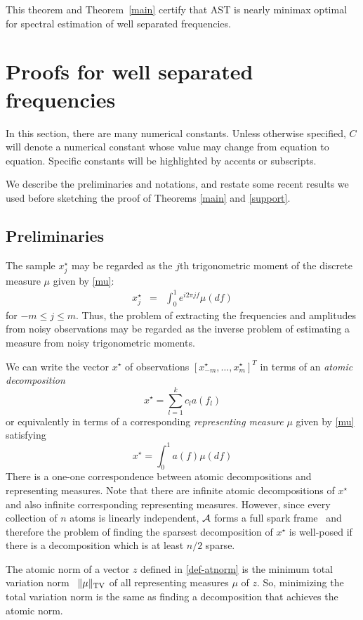 This theorem and Theorem~\ref{main} certify that AST is nearly minimax optimal for spectral estimation of well separated frequencies. 

\section{Proofs for well separated frequencies}
\label{sec:proofs}

In this section, there are many numerical constants. Unless otherwise specified,
$C$ will denote a numerical constant whose value may change from equation to
equation. Specific constants will be highlighted by accents or subscripts.

We describe the preliminaries and notations, and restate some recent results we
used before sketching the proof of Theorems \ref{main} and \ref{support}.

\subsection{Preliminaries}
The sample $x^\star_j$ may be regarded as the $j$th trigonometric moment of 
the discrete measure $\mu$ given by \eqref{mu}:
\begin{eqnarray*}
  x_j^\star & = & \int_0^1 e^{i 2 \pi j f} \mu ( d f)
\end{eqnarray*}
for $-m \leq j \leq m$.
Thus, the problem of extracting the frequencies and amplitudes from noisy 
observations may be regarded as the inverse problem of estimating a measure 
from noisy trigonometric moments.

We can write the vector $x^\star$ of observations $[x_{-m}^\star, \ldots, x_m^\star]^T$ in terms of an \emph{atomic decomposition}
\[
x^\star = \sum_{l=1}^k c_l a(f_l)
\]
or equivalently in terms of a corresponding \emph{representing measure} $\mu$ given by \eqref{mu} satisfying
\[
x^\star = \int_0^1 a(f) \mu(df)
\]
There is a one-one correspondence between atomic decompositions and representing measures. Note that there are infinite atomic decompositions of $x^\star$ and also infinite corresponding representing measures. However, since every collection of $n$ atoms is linearly independent, $\mathcal{A}$ forms a full spark frame~\cite{spark} and therefore the problem of finding the sparsest decomposition of $x^\star$ is well-posed if there is a decomposition which is at least $n/2$ sparse.

The atomic norm of a vector $z$ defined in \eqref{def-atnorm} is the minimum total variation norm~\cite{cs_otg,tvnorm} $\lVert\mu\rVert_{\mathrm{TV}}$ of all representing measures $\mu$ of $z$. So, minimizing the total variation norm is the same as finding a decomposition that achieves the atomic norm.

